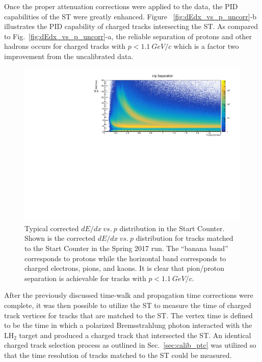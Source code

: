 Once the proper attenuation corrections were applied to the data, the PID capabilities of the ST were greatly enhanced.  Figure ~\ref{fig:dEdx_vs_p_uncorr}-b illustrates the PID capability of charged tracks intersecting the ST.  As compared to Fig.~\ref{fig:dEdx_vs_p_uncorr}-a, the reliable separation of protons and other hadrons occurs for charged tracks with $p < 1.1\ GeV/c$ which is a factor two improvement from the uncalibrated data.
	\begin{figure}[!htb]
		\centering
		\includegraphics[width=1.0\columnwidth]{performance/figs/Att_corr}
		\caption{Typical corrected $dE/dx\ vs.\ p$ distribution in the Start Counter.  Shown is the corrected $dE/dx\ vs.\ p$ distribution for tracks matched to the Start Counter in the Spring 2017 run. The ``banana band'' corresponds to protons while the horizontal band corresponds to charged electrons, pions, and kaons.  It is clear that pion/proton separation is achievable for tracks with $p < 1.1\ GeV/c$.}
		\label{fig:dEdx_vs_p_corr}
	\end{figure}  

After the previously discussed time-walk and propagation time corrections were complete, it was then possible to utilize the ST to measure the time of charged track vertices for tracks that are matched to the ST.  The vertex time is defined to be the time in which a polarized Bremsstrahlung photon interacted with the $\mathrm{LH_{2}}$ target and produced a charged track that intersected the ST.  An identical charged track selection process as outlined in Sec.~\ref{sec:calib_ptc} was utilized so that the time resolution of tracks matched to the ST could be measured.

